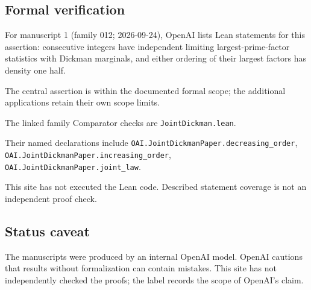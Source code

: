 \documentclass[11pt]{article}
\begin{document}
\subsection{Formal verification}
For manuscript 1 (family 012; 2026-09-24), OpenAI lists Lean statements for this assertion: consecutive integers have independent limiting largest-prime-factor statistics with Dickman marginals, and either ordering of their largest factors has density one half.

The central assertion is within the documented formal scope; the additional applications retain their own scope limits.

The linked family Comparator checks are \texttt{JointDickman.lean}.

Their named declarations include \texttt{OAI.JointDickmanPaper.decreasing\_order}, \texttt{OAI.JointDickmanPaper.increasing\_order}, \texttt{OAI.JointDickmanPaper.joint\_law}.

This site has not executed the Lean code. Described statement coverage is not an independent proof check.

\subsection{Status caveat}
The manuscripts were produced by an internal OpenAI model. OpenAI cautions that results without formalization can contain mistakes. This site has not independently checked the proofs; the label records the scope of OpenAI's claim.
\end{document}
